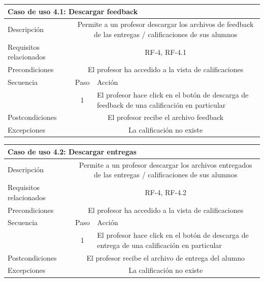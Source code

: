 \hspace{3cm} 

\begin{tabular}[H]{l c l}
\toprule 
\multicolumn{3}{l}{\textbf{Caso de uso 4.1: Descargar feedback}}\\
\midrule
Descripción & \multicolumn{2}{p{10cm}}{Permite a un profesor descargar los archivos de feedback de las entregas / calificaciones de sus alumnos}\\
\midrule
Requisitos relacionados & \multicolumn{2}{p{10cm}}{RF-4, RF-4.1}\\
\midrule
Precondiciones & \multicolumn{2}{p{10cm}}{El profesor ha accedido a la vista de calificaciones}\\
\midrule
Secuencia & Paso & Acción \\
\cmidrule{2-3}
         & 1 &  \multicolumn{1}{p{8cm}}{El profesor hace click en el botón de descarga de feedback de una calificación en particular}\\
\midrule
Postcondiciones & \multicolumn{2}{p{10cm}}{El profesor recibe el archivo feedback}\\
\midrule
Excepciones & \multicolumn{2}{p{10cm}}{La calificación no existe}\\
\bottomrule 
\end{tabular}



\hspace{3cm} 


\begin{tabular}[H]{l c l}
\toprule 
\multicolumn{3}{l}{\textbf{Caso de uso 4.2: Descargar entregas}}\\
\midrule
Descripción & \multicolumn{2}{p{10cm}}{Permite a un profesor descargar los archivos entregados de las entregas / calificaciones de sus alumnos}\\
\midrule
Requisitos relacionados & \multicolumn{2}{p{10cm}}{RF-4, RF-4.2}\\
\midrule
Precondiciones & \multicolumn{2}{p{10cm}}{El profesor ha accedido a la vista de calificaciones}\\
\midrule
Secuencia & Paso & Acción \\
\cmidrule{2-3}
         & 1 &  \multicolumn{1}{p{8cm}}{El profesor hace click en el botón de descarga de entrega de una calificación en particular}\\
\midrule
Postcondiciones & \multicolumn{2}{p{10cm}}{El profesor recibe el archivo de entrega del alumno}\\
\midrule
Excepciones & \multicolumn{2}{p{10cm}}{La calificación no existe}\\
\bottomrule 
\end{tabular}

